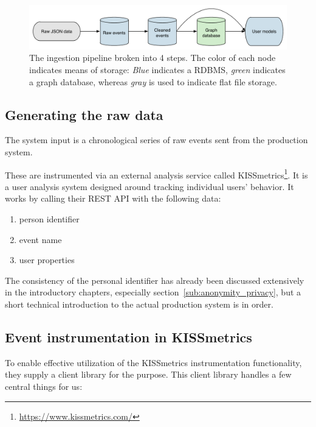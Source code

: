 \begin{figure}[h]
  \centering
    \includegraphics[width=\textwidth]{Figures/ingestion-pipeline}
  \caption{The ingestion pipeline broken into 4 steps. The color of each node indicates means of storage: \emph{Blue} indicates a RDBMS, \emph{green} indicates a graph database, whereas \emph{gray} is used to indicate flat file storage.}
  \label{fig:ingestion-pipeline}
\end{figure}

\subsection{Generating the raw data}
\label{sub:generating_data}

The system input is a chronological series of raw events sent from the production system.

These are instrumented via an external analysis service called KISSmetrics\footnote{\url{https://www.kissmetrics.com/}}. It is a user analysis system designed around tracking individual users' behavior. It works by calling their REST API with the following data:

\begin{enumerate}
  \item person identifier
  \item event name
  \item user properties
\end{enumerate}

The consistency of the personal identifier has already been discussed extensively in the introductory chapters, especially section~\ref{sub:anonymity_privacy}, but a short technical introduction to the actual production system is in order.

\subsection{Event instrumentation in KISSmetrics}
\label{sub:event_instrumentation}

To enable effective utilization of the KISSmetrics instrumentation functionality, they supply a client library for the purpose. This client library handles a few central things for us:

